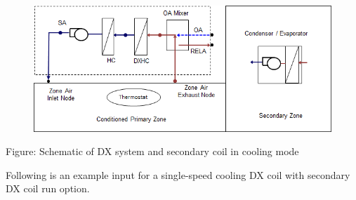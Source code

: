 \begin{figure}[htbp]
\centering
\includegraphics{media/image904.png}
\caption{}
\end{figure}

Figure: Schematic of DX system and secondary coil in cooling mode

Following is an example input for a single-speed cooling DX coil with secondary DX coil run option.

